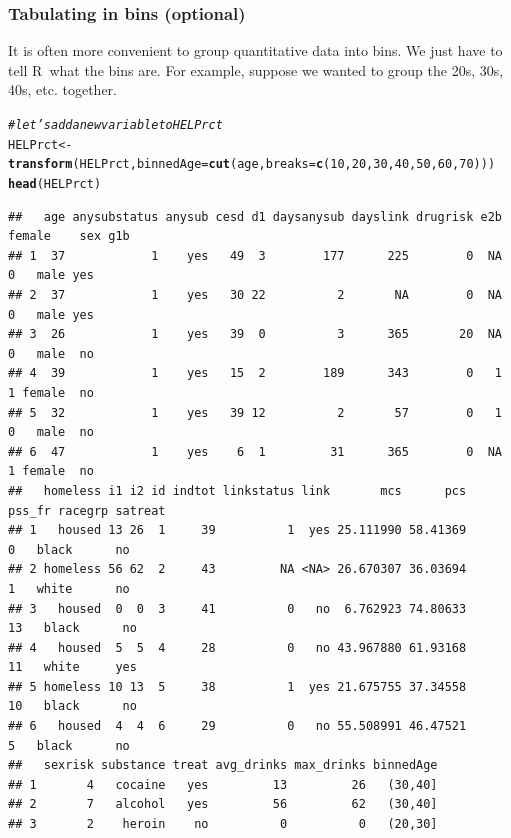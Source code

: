 \documentclass[twoside]{book}\usepackage[]{graphicx}\usepackage[]{xcolor}
\makeatletter
\newcommand{\hlnum}[1]{\textcolor[rgb]{0.686,0.059,0.569}{#1}}%
\newcommand{\hlcom}[1]{\textcolor[rgb]{0.678,0.584,0.686}{\textit{#1}}}%
\newcommand{\hlstd}[1]{\textcolor[rgb]{0.345,0.345,0.345}{#1}}%
\newcommand{\hlkwb}[1]{\textcolor[rgb]{0.69,0.353,0.396}{#1}}%
\newcommand{\hlkwc}[1]{\textcolor[rgb]{0.333,0.667,0.333}{#1}}%
\newcommand{\hlkwd}[1]{\textcolor[rgb]{0.737,0.353,0.396}{\textbf{#1}}}%
\newenvironment{kframe}{%
 \def\at@end@of@kframe{}%
 \ifinner\ifhmode%
  \def\at@end@of@kframe{\end{minipage}}%
  \begin{minipage}{\columnwidth}%
 \fi\fi%
 \def\FrameCommand##1{\hskip\@totalleftmargin \hskip-\fboxsep
 \colorbox{shadecolor}{##1}\hskip-\fboxsep
     \hskip-\linewidth \hskip-\@totalleftmargin \hskip\columnwidth}%
 \MakeFramed {\advance\hsize-\width
   \@totalleftmargin\z@ \linewidth\hsize
   \@setminipage}}%
 {\par\unskip\endMakeFramed%
 \at@end@of@kframe}
\newenvironment{knitrout}{}{} %
\newcommand{\Rindex}[1]{\index{\texttt{#1}}}
\def\R{{\sf R}}
\newcounter{example}[section]
\makeatother
\begin{document}
\subsubsection*{Tabulating in bins (optional)}
It is often more convenient to group quantitative data into bins.  We just have to tell \R\ what the bins are.
For example, suppose we wanted to group the 20s, 30s, 40s, etc. together.
\Rindex{cut()}%
\Rindex{xtabs()}%
\Rindex{mtable()}%
\Rindex{table()}%
\begin{knitrout}
\color{fgcolor}\begin{kframe}
\begin{alltt}
\hlcom{# let's add a new variable to HELPrct}
\hlstd{HELPrct} \hlkwb{<-} \hlkwd{transform}\hlstd{(HELPrct,} \hlkwc{binnedAge} \hlstd{=} \hlkwd{cut}\hlstd{(age,} \hlkwc{breaks}\hlstd{=}\hlkwd{c}\hlstd{(}\hlnum{10}\hlstd{,}\hlnum{20}\hlstd{,}\hlnum{30}\hlstd{,}\hlnum{40}\hlstd{,}\hlnum{50}\hlstd{,}\hlnum{60}\hlstd{,}\hlnum{70}\hlstd{) ))}
\hlkwd{head}\hlstd{(HELPrct)}
\end{alltt}
\begin{verbatim}
##   age anysubstatus anysub cesd d1 daysanysub dayslink drugrisk e2b female    sex g1b
## 1  37            1    yes   49  3        177      225        0  NA      0   male yes
## 2  37            1    yes   30 22          2       NA        0  NA      0   male yes
## 3  26            1    yes   39  0          3      365       20  NA      0   male  no
## 4  39            1    yes   15  2        189      343        0   1      1 female  no
## 5  32            1    yes   39 12          2       57        0   1      0   male  no
## 6  47            1    yes    6  1         31      365        0  NA      1 female  no
##   homeless i1 i2 id indtot linkstatus link       mcs      pcs pss_fr racegrp satreat
## 1   housed 13 26  1     39          1  yes 25.111990 58.41369      0   black      no
## 2 homeless 56 62  2     43         NA <NA> 26.670307 36.03694      1   white      no
## 3   housed  0  0  3     41          0   no  6.762923 74.80633     13   black      no
## 4   housed  5  5  4     28          0   no 43.967880 61.93168     11   white     yes
## 5 homeless 10 13  5     38          1  yes 21.675755 37.34558     10   black      no
## 6   housed  4  4  6     29          0   no 55.508991 46.47521      5   black      no
##   sexrisk substance treat avg_drinks max_drinks binnedAge
## 1       4   cocaine   yes         13         26   (30,40]
## 2       7   alcohol   yes         56         62   (30,40]
## 3       2    heroin    no          0          0   (20,30]

\end{verbatim}
\end{kframe}
\end{knitrout}
\end{document}
